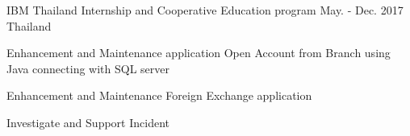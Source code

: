 \begin{cventries}
 \cventry
    {IBM Thailand} %
    {Internship and Cooperative Education program} %
    {May. - Dec. 2017} %
    {Thailand} %
    {
      \begin{cvitems} %
        \item {Enhancement and Maintenance application Open Account from Branch using Java connecting with SQL server}
        \item {Enhancement and Maintenance Foreign Exchange application}
        \item {Investigate and Support Incident}
      \end{cvitems}
    }

\end{cventries}
